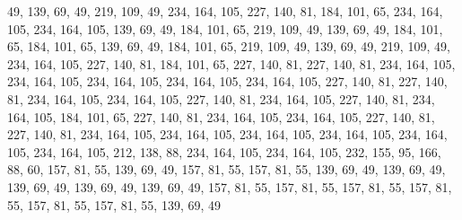 49, 139, 69, 49, 219, 109, 49, 234, 164, 105, 227, 140, 81, 184, 101, 65,
234, 164, 105, 234, 164, 105, 139, 69, 49, 184, 101, 65, 219, 109, 49, 139,
69, 49, 184, 101, 65, 184, 101, 65, 139, 69, 49, 184, 101, 65, 219, 109,
49, 139, 69, 49, 219, 109, 49, 234, 164, 105, 227, 140, 81, 184, 101, 65,
227, 140, 81, 227, 140, 81, 234, 164, 105, 234, 164, 105, 234, 164, 105, 234,
164, 105, 234, 164, 105, 227, 140, 81, 227, 140, 81, 234, 164, 105, 234, 164,
105, 227, 140, 81, 234, 164, 105, 227, 140, 81, 234, 164, 105, 184, 101, 65,
227, 140, 81, 234, 164, 105, 234, 164, 105, 227, 140, 81, 227, 140, 81, 234,
164, 105, 234, 164, 105, 234, 164, 105, 234, 164, 105, 234, 164, 105, 234, 164,
105, 212, 138, 88, 234, 164, 105, 234, 164, 105, 232, 155, 95, 166, 88, 60,
157, 81, 55, 139, 69, 49, 157, 81, 55, 157, 81, 55, 139, 69, 49, 139,
69, 49, 139, 69, 49, 139, 69, 49, 139, 69, 49, 157, 81, 55, 157, 81,
55, 157, 81, 55, 157, 81, 55, 157, 81, 55, 157, 81, 55, 139, 69, 49
